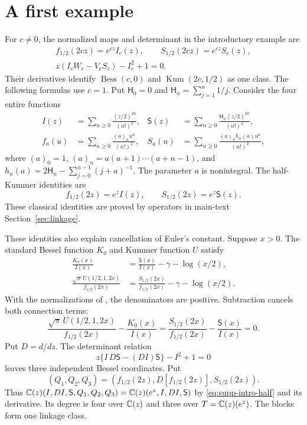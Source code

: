 \section{A first example}\label{sup:first-example}
For $c\ne0$, the normalized maps and determinant in the introductory
example are
\[
\begin{gathered}
 f_{1/2}(2cz)=e^{cz}I_c(z),\qquad
 S_{1/2}(2cz)=e^{cz}S_c(z),\\
 z(I_cW_c-V_cS_c)-I_c^2+1=0.
\end{gathered}
\]
Their derivatives identify $\operatorname{Bess}(c,0)$ and
$\operatorname{Kum}(2c,1/2)$ as one class. The following formulas use $c=1$.
Put $\mathsf H_0=0$ and $\mathsf H_n=\sum_{j=1}^n1/j$. Consider the four entire functions
\begin{equation}\label{eq:supp-intro-series}
\begin{aligned}
 I(z)&=\sum_{n\ge0}\frac{(z/2)^{2n}}{(n!)^2},&
 \mathsf S(z)&=\sum_{n\ge0}\frac{\mathsf H_n(z/2)^{2n}}{(n!)^2},\\
 f_a(u)&=\sum_{n\ge0}\frac{(a)_nu^n}{(n!)^2},&
 S_a(u)&=\sum_{n\ge0}\frac{(a)_nh_n(a)u^n}{(n!)^2},
\end{aligned}
\end{equation}
where $(a)_0=1$, $(a)_n=a(a+1)\cdots(a+n-1)$, and
$h_n(a)=2\mathsf H_n-\sum_{j=0}^{n-1}(j+a)^{-1}$. The parameter $a$ is
nonintegral. The half-Kummer identities are
\begin{equation}\label{eq:supp-intro-half}
 f_{1/2}(2z)=e^zI(z),\qquad S_{1/2}(2z)=e^z\mathsf S(z).
\end{equation}
These classical identities \cite[10.39.5,13.2.9,13.6.10]{DLMF}
are proved by operators in main-text Section~\ref{sec:linkage}.

These identities also explain cancellation of Euler's constant. Suppose $x>0$.
The standard Bessel function $K_0$ and Kummer function $U$ satisfy
\begin{equation}\label{eq:supp-intro-connection}
\begin{aligned}
 \frac{K_0(x)}{I(x)}
   &=\frac{\mathsf S(x)}{I(x)}-\gamma-\log(x/2),\\
 \frac{\sqrt\pi\,U(1/2,1,2x)}{f_{1/2}(2x)}
   &=\frac{S_{1/2}(2x)}{f_{1/2}(2x)}-\gamma-\log(x/2).
\end{aligned}
\end{equation}
With the normalizations of \cite[10.31.2, 13.2.9, 13.6.10]{DLMF},
the denominators are positive. Subtraction cancels both connection terms:
\begin{equation}\label{eq:supp-intro-gamma-free}
 \frac{\sqrt\pi\,U(1/2,1,2x)}{f_{1/2}(2x)}
 -\frac{K_0(x)}{I(x)}
 =\frac{S_{1/2}(2x)}{f_{1/2}(2x)}-\frac{\mathsf S(x)}{I(x)}=0.
\end{equation}
Put $D=d/dz$. The determinant relation
\begin{equation}\label{eq:supp-intro-determinant}
 z\{I\,D\mathsf S-(DI)\mathsf S\}-I^2+1=0
\end{equation}
leaves three independent Bessel coordinates. Put
\[ (Q_1,Q_2,Q_3)=(f_{1/2}(2z),D[f_{1/2}(2z)],S_{1/2}(2z)). \]
Thus $\mathbb{C}(z)(I,DI,\mathsf S,Q_1,Q_2,Q_3)=\mathbb{C}(z)(e^z,I,DI,\mathsf S)$ by
\eqref{eq:supp-intro-half} and its derivative. Its degree is four over
$\mathbb{C}(z)$ and three over $T=\mathbb{C}(z)(e^z)$.
The blocks form one linkage class.
